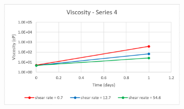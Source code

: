 \begin{appendices}
\begin{figure}
{\begin{subfigure}[b]{0.6\textwidth}
     \end{subfigure}
     \begin{subfigure}[b]{0.6\textwidth}
         \centering
         \includegraphics[width=\textwidth]{img/visc/4.png}
     \end{subfigure}
    }\\
\end{figure}
\end{appendices}
